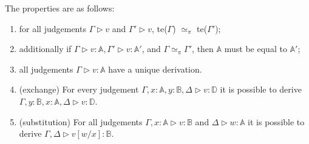 The properties are as follows:
 \begin{enumerate}
   \item for all judgements $\Gamma \triangleright v$ and $\Gamma' \triangleright v$, te($\Gamma$) $\simeq_{\pi}$  te($\Gamma'$); 
   \item additionally if $\Gamma \triangleright v: \mathbb{A}, \Gamma'\triangleright v: \mathbb{A}'$, and $\Gamma \simeq_{\pi} \Gamma' $, then $\mathbb{A}$ must be equal to $\mathbb{A}'$;
   \item all judgements $\Gamma \triangleright v:\mathbb{A}$ have a unique derivation.
   \item (exchange) For every judgement $\Gamma,x:\mathbb{A}, y:\mathbb{B}, \Delta \triangleright v: \mathbb{D}$ it is possible to derive $\Gamma, y:\mathbb{B}, x:\mathbb{A}, \Delta \triangleright v: \mathbb{D}$. 
   \item (substitution) For all judgements  $\Gamma,x:\mathbb{A} \triangleright v: \mathbb{B}$ and $\Delta \triangleright w: \mathbb{A}$ it is possible to derive $ \Gamma, \Delta \triangleright v[w/x]: \mathbb{B}$.
 \end{enumerate}
 


